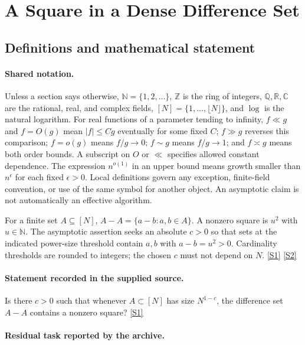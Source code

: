 \documentclass[11pt,a4paper]{article}
\newcommand{\N}{\mathbb{N}}
\newcommand{\Z}{\mathbb{Z}}
\newcommand{\Q}{\mathbb{Q}}
\newcommand{\R}{\mathbb{R}}
\newcommand{\C}{\mathbb{C}}
\newcommand{\sref}[2]{\hyperlink{source:#1:#2}{[S#2]}}
\begin{document}
\section{A Square in a Dense Difference Set}\label{statement}


\subsection{Definitions and mathematical statement}

\paragraph{Shared notation.}Unless a section says otherwise, $\N=\{1,2,\ldots\}$,
$\Z$ is the ring of integers, $\Q,\R,\C$ are the rational, real, and complex
fields, $[N]=\{1,\ldots,\lfloor N\rfloor\}$, and $\log$ is the natural
logarithm. For real functions of a parameter tending to infinity,
$f\ll g$ and $f=O(g)$ mean $|f|\leq Cg$ eventually for some fixed $C$;
$f\gg g$ reverses this comparison; $f=o(g)$ means $f/g\to0$;
$f\sim g$ means $f/g\to1$; and $f\asymp g$ means both order bounds.
A subscript on $O$ or $\ll$ specifies allowed constant dependence.
The expression $n^{o(1)}$ in an upper bound means growth smaller than
$n^\epsilon$ for each fixed $\epsilon>0$. Local definitions govern any
exception, finite-field convention, or use of the same symbol for another
object. An asymptotic claim is not automatically an effective algorithm.



For a finite set $A\subseteq[N]$, $A-A=\{a-b:a,b\in A\}$. A nonzero square is $u^2$ with $u\in\N$. The asymptotic assertion seeks an absolute $c>0$ so that sets at the indicated power-size threshold contain $a,b$ with $a-b=u^2>0$. Cardinality thresholds are rounded to integers; the chosen $c$ must not depend on $N$. \sref{statement}{1} \sref{statement}{2}

\paragraph{Statement recorded in the supplied source.}
Is there $c > 0$ such that whenever $A \subset [N]$ has size $N^{1-c}$, the difference set $A - A$ contains a nonzero square? \sref{statement}{1}

\paragraph{Residual task reported by the archive.}
\end{document}
